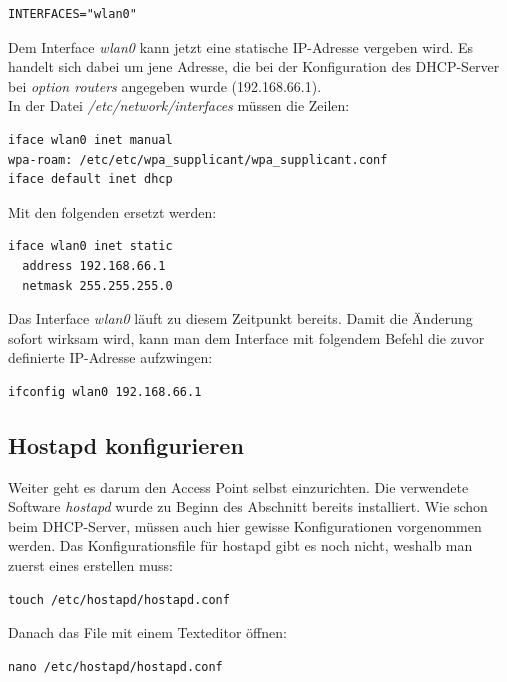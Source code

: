 \begin{lstlisting}
INTERFACES="wlan0"
\end{lstlisting}

Dem Interface \textit{wlan0} kann jetzt eine statische IP-Adresse vergeben wird. Es handelt sich dabei um jene Adresse, die bei der Konfiguration des DHCP-Server bei \textit{option routers} angegeben wurde (192.168.66.1). \\
In der Datei \textit{/etc/network/interfaces} müssen die Zeilen:

\begin{lstlisting}
iface wlan0 inet manual
wpa-roam: /etc/etc/wpa_supplicant/wpa_supplicant.conf
iface default inet dhcp
\end{lstlisting}

Mit den folgenden ersetzt werden:

\begin{lstlisting}
iface wlan0 inet static
  address 192.168.66.1
  netmask 255.255.255.0
\end{lstlisting}


Das Interface \textit{wlan0} läuft zu diesem Zeitpunkt bereits. Damit die Änderung sofort wirksam wird, kann man dem Interface mit folgendem Befehl die zuvor definierte IP-Adresse aufzwingen:

\begin{lstlisting}
ifconfig wlan0 192.168.66.1
\end{lstlisting}


\subsection{Hostapd konfigurieren}
Weiter geht es darum den Access Point selbst einzurichten. Die verwendete Software \textit{hostapd} wurde zu Beginn des Abschnitt bereits installiert. 
Wie schon beim DHCP-Server, müssen auch hier gewisse Konfigurationen vorgenommen werden. Das Konfigurationsfile für hostapd gibt es noch nicht, weshalb man zuerst eines erstellen muss:

\begin{lstlisting}
touch /etc/hostapd/hostapd.conf
\end{lstlisting}

Danach das File mit einem Texteditor öffnen:

\begin{lstlisting}
nano /etc/hostapd/hostapd.conf
\end{lstlisting}

